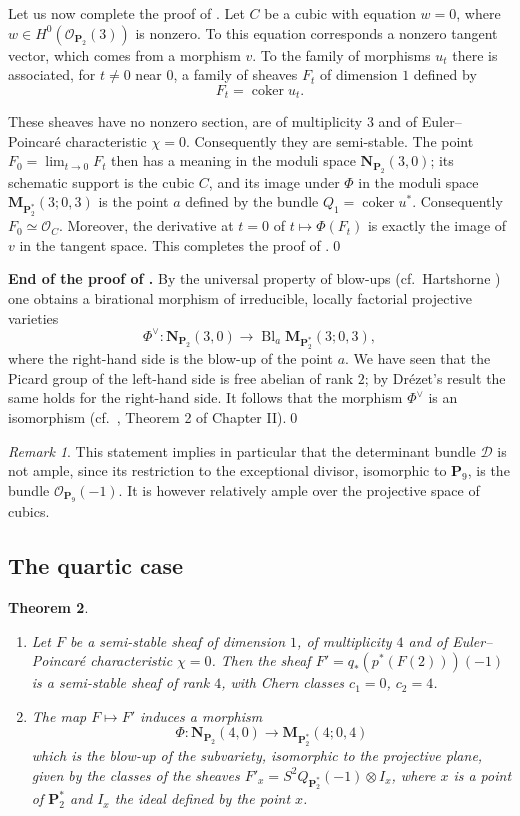 \documentclass[12pt,english]{smfart}%
\theoremstyle{plain}
\newtheorem{theorem}{Theorem}[section]
\theoremstyle{definition}
\theoremstyle{remark}
\newtheorem{remark}[theorem]{Remark}
\newcommand{\PP}{\mathbf{P}}
\newcommand{\Pd}{\PP_{2}^{*}}          %
\newcommand{\NN}{\mathbf{N}}           %
\newcommand{\MM}{\mathbf{M}}           %
\newcommand{\Oo}{\mathcal{O}}
\DeclareMathOperator{\coker}{coker}
\DeclareMathOperator{\Bl}{Bl}
\newcommand{\origpage}[1]{\marginnote{\scriptsize\itshape p.~#1}}
\begin{document}
Let us now complete the proof of . Let $C$ be a cubic with equation $w=0$, where $w\in H^0(\Oo_{\PP_2}(3))$ is nonzero. To this equation corresponds a nonzero tangent vector, which comes from a morphism $v$. To the family of morphisms $u_t$ there is associated, for $t\neq 0$ near $0$, a family of sheaves $F_t$ of dimension $1$ defined by
\[
F_t = \coker u_t .
\]

These sheaves have no nonzero section, are of multiplicity $3$ and of Euler--Poincar\'e characteristic $\chi = 0$. Consequently they are semi-stable. The point $F_0 = \lim_{t\to 0}F_t$ then has a meaning in the moduli space $\NN_{\PP_2}(3,0)$; its schematic support is the cubic $C$, and its image under $\Phi$ in the moduli space $\MM_{\Pd}(3;0,3)$ is the point $a$ defined by the bundle $Q_1 = \coker u^*$. Consequently $F_0\simeq \Oo_C$. Moreover, the derivative at $t=0$ of $t\mapsto \Phi(F_t)$ is exactly the image of $v$ in the tangent space. This completes the proof of .\qed

\medskip
\noindent\textbf{End of the proof of .} By the universal property of blow-ups (cf.\ Hartshorne \cite{Har}) one obtains a birational morphism of irreducible, locally factorial projective varieties
\[
\Phi^{\vee} : \NN_{\PP_2}(3,0)\longrightarrow \Bl_a\MM_{\Pd}(3;0,3),
\]
where the right-hand side is the blow-up of the point $a$. We have seen that the Picard group of the left-hand side is free abelian of rank $2$; by Dr\'ezet's result \cite{Dre1} the same holds for the right-hand side. It follows that the morphism $\Phi^{\vee}$ is an isomorphism (cf.\ \cite{Shaf}, Theorem 2 of Chapter II).\qed

\begin{remark}\label{rem:not-ample}
This statement implies in particular that the determinant bundle $\mathcal{D}$
\origpage{661}%
is not ample, since its restriction to the exceptional divisor, isomorphic to $\PP_9$, is the bundle $\Oo_{\PP_9}(-1)$. It is however relatively ample over the projective space of cubics.
\end{remark}

\subsection{The quartic case}\label{subsec:quartic}

\begin{theorem}\label{thm:quartic}\
\begin{enumerate}
\item[(1)] Let $F$ be a semi-stable sheaf of dimension $1$, of multiplicity $4$ and of Euler--Poincar\'e characteristic $\chi = 0$. Then the sheaf $F' = q_*(p^*(F(2)))(-1)$ is a semi-stable sheaf of rank $4$, with Chern classes $c_1 = 0$, $c_2 = 4$.
\item[(2)] The map $F\mapsto F'$ induces a morphism
\[
\Phi : \NN_{\PP_2}(4,0)\longrightarrow \MM_{\Pd}(4;0,4)
\]
which is the blow-up of the subvariety, isomorphic to the projective plane, given by the classes of the sheaves $F'_x = S^2Q_{\Pd}(-1)\otimes I_x$, where $x$ is a point of $\Pd$ and $I_x$ the ideal defined by the point $x$.
\end{enumerate}
\end{theorem}
\end{document}
